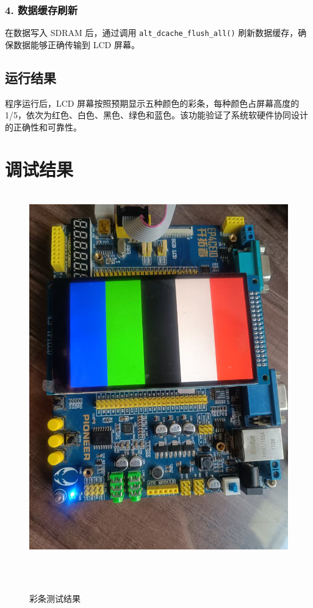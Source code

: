 \documentclass[12pt,hyperref,a4paper,UTF8]{ctexart}
\begin{document}
\subsubsection*{4. 数据缓存刷新}
在数据写入 SDRAM 后，通过调用 \lstinline|alt_dcache_flush_all()| 刷新数据缓存，确保数据能够正确传输到 LCD 屏幕。

\subsection{运行结果}

程序运行后，LCD 屏幕按照预期显示五种颜色的彩条，每种颜色占屏幕高度的 1/5，依次为红色、白色、黑色、绿色和蓝色。该功能验证了系统软硬件协同设计的正确性和可靠性。

\section{调试结果}


\begin{figure}[H] %
        \centering
        \includegraphics[width=1\textwidth]{figures/003.jpg} %
        \caption{彩条测试结果} %
        \label{fig:example} %
\end{figure}
\end{document}
